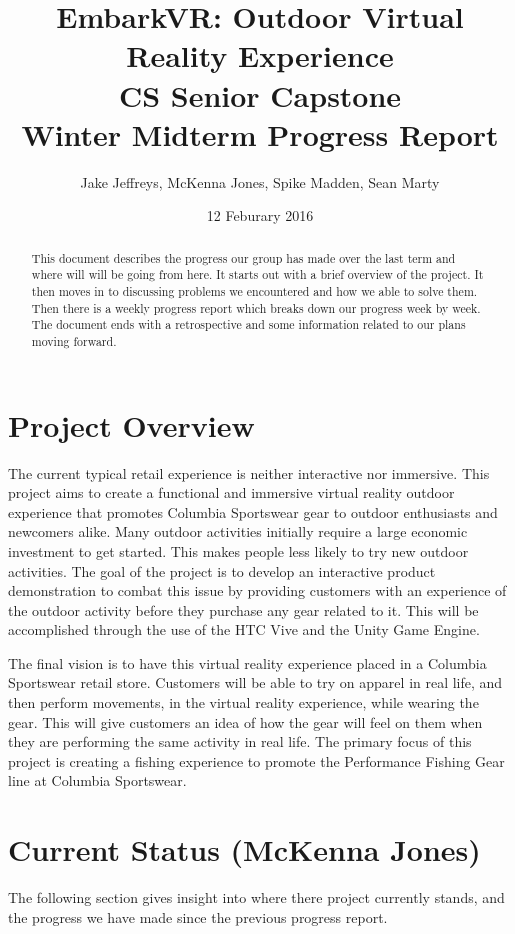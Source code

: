 \documentclass[10pt,journal,compsoc,onecolumn, draftclsnofoot]{IEEEtran}
\title{
EmbarkVR: Outdoor Virtual Reality Experience \\
CS Senior Capstone \\
Winter Midterm Progress Report\\
\vspace{1mm}
}
\author{Jake Jeffreys, McKenna Jones, Spike Madden, Sean Marty}
\date{12 Feburary 2016}
\begin{document}
\begin{titlepage}
\maketitle
\vspace{1mm}
\begin{abstract}
This document describes the progress our group has made over the last term and where will will be going from here. It starts out with a brief overview of the project. It then moves in to discussing problems we encountered and how we able to solve them. Then there is a weekly progress report which breaks down our progress week by week. The document ends with a retrospective and some information related to our plans moving forward.
\end{abstract}
\vspace{1cm}
\end{titlepage}
\tableofcontents
\clearpage


\section{Project Overview}
The current typical retail experience is neither interactive nor immersive.
This project aims to create a functional and immersive virtual reality outdoor experience that promotes Columbia Sportswear gear to outdoor enthusiasts and newcomers alike.
Many outdoor activities initially require a large economic investment to get started.
This makes people less likely to try new outdoor activities.
The goal of the project is to develop an interactive product demonstration to combat this issue by providing customers with an experience of the outdoor activity before they purchase any gear related to it.
This will be accomplished through the use of the HTC Vive and the Unity Game Engine.

The final vision is to have this virtual reality experience placed in a Columbia Sportswear retail store.
Customers will be able to try on apparel in real life, and then perform movements, in the virtual reality experience, while wearing the gear.
This will give customers an idea of how the gear will feel on them when they are performing the same activity in real life.
The primary focus of this project is creating a fishing experience to promote the Performance Fishing Gear line at Columbia Sportswear.

\section{Current Status (McKenna Jones)}
The following section gives insight into where there project currently stands, and the progress we have made since the previous progress report.
\end{document}
